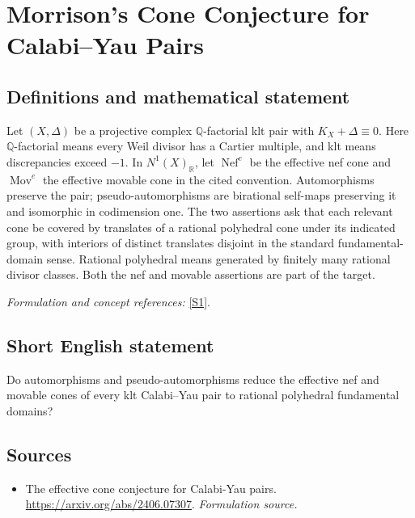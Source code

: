 \documentclass[11pt]{article}
\begin{document}
\section*{\texorpdfstring{Morrison’s Cone Conjecture for Calabi–Yau Pairs}{Morrison’s Cone Conjecture for Calabi–Yau Pairs}}\label{statement}
\subsection{Definitions and mathematical statement}
Let $(X,\Delta)$ be a projective complex ${\mathbb{Q}}$-factorial klt pair with $K_X+\Delta\equiv0$. Here ${\mathbb{Q}}$-factorial means every Weil divisor has a Cartier multiple, and klt means discrepancies exceed $-1$. In $N^1(X)_{{\mathbb{R}}}$, let $\operatorname{Nef}^e$ be the effective nef cone and $\operatorname{Mov}^e$ the effective movable cone in the cited convention. Automorphisms preserve the pair; pseudo-automorphisms are birational self-maps preserving it and isomorphic in codimension one. The two assertions ask that each relevant cone be covered by translates of a rational polyhedral cone under its indicated group, with interiors of distinct translates disjoint in the standard fundamental-domain sense. Rational polyhedral means generated by finitely many rational divisor classes. Both the nef and movable assertions are part of the target.
\par\smallskip\textit{Formulation and concept references:} \href{https://arxiv.org/abs/2406.07307}{[S1]}.

\subsection{Short English statement}
Do automorphisms and pseudo-automorphisms reduce the effective nef and movable cones of every klt Calabi–Yau pair to rational polyhedral fundamental domains?
\subsection{Sources}
\begin{itemize}
\item[S1]The effective cone conjecture for Calabi-Yau pairs.
\url{https://arxiv.org/abs/2406.07307}.
\textit{Formulation source.}
\end{itemize}
\end{document}
